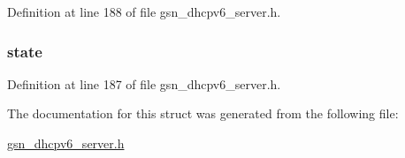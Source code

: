 Definition at line 188 of file gsn\_\-dhcpv6\_\-server.h.

\hypertarget{a00047_a6e9c4cbd32a1178b12f3a61f6855c896}{
\subsubsection[{state}]{ {\bf state}}}
\label{a00047_a6e9c4cbd32a1178b12f3a61f6855c896}


Definition at line 187 of file gsn\_\-dhcpv6\_\-server.h.



The documentation for this struct was generated from the following file:\begin{DoxyCompactItemize}
\item 
\hyperlink{a00483}{gsn\_\-dhcpv6\_\-server.h}\end{DoxyCompactItemize}
